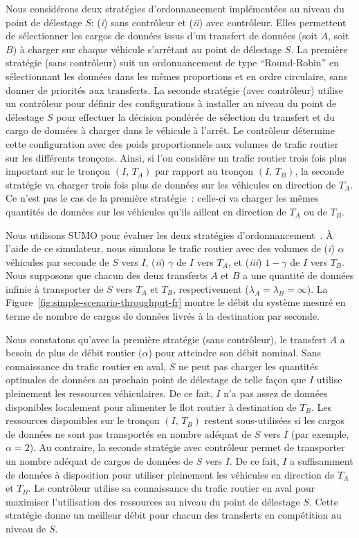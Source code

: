  
Nous considérons deux stratégies d’ordonnancement implémentées au niveau du point de délestage $S$: (\textit{i}) sans contrôleur et (\textit{ii}) avec contrôleur. Elles permettent de sélectionner les cargos de données issus d’un transfert de données (soit $A$, soit $B$) à charger sur chaque véhicule s’arrêtant au point de délestage $S$. La première stratégie (sans contrôleur) suit un ordonnancement de type ``Round-Robin'' en sélectionnant les données dans les mêmes proportions et en ordre circulaire, sans donner de priorités aux transferts. La seconde stratégie (avec contrôleur) utilise un contrôleur pour définir des configurations à installer au niveau du point de délestage $S$ pour effectuer la décision pondérée de sélection du transfert et du cargo de données à charger dans le véhicule à l’arrêt. Le contrôleur détermine cette configuration avec des poids proportionnels aux volumes de trafic routier sur les différents tronçons. Ainsi, si l’on considère un trafic routier trois fois plus important sur le tronçon $(I,\,T_A)$ par rapport au tronçon $(I,\,T_B)$, la seconde stratégie va charger trois fois plus de données sur les véhicules en direction de $T_A$. Ce n’est pas le cas de la première stratégie~: celle-ci va charger les mêmes quantités de données sur les véhicules qu’ils aillent en direction de $T_A$ ou de $T_B$. 
 
 
Nous utilisons SUMO pour évaluer les deux stratégies d’ordonnancement~\cite{behrisch2011sumo}. À l’aide de ce simulateur, nous simulons le trafic routier avec des volumes de (\textit{i}) $\alpha$ véhicules par seconde de $S$ vers $I$, (\textit{ii}) $\gamma$ de $I$ vers $T_A$, et (\textit{iii}) $1 - \gamma$ de $I$ vers $T_B$. Nous supposons que chacun des deux transferts $A$ et $B$ a une quantité de données infinie à transporter de $S$ vers $T_A$ et $T_B$, respectivement (\ie $\lambda_A = \lambda_B = \infty$). La Figure~\ref{fig:simple-scenario-throughput-fr} montre le débit du système mesuré en terme de nombre de cargos de données livrés à la destination par seconde.  
 
 
Nous constatons qu’avec la première stratégie (sans contrôleur), le transfert $A$ a besoin de plus de débit routier ($\alpha$) pour atteindre son débit nominal. Sans connaissance du trafic routier en aval, $S$ ne peut pas charger les quantités optimales de données au prochain point de délestage de telle façon que $I$ utilise pleinement les ressources véhiculaires. De ce fait, $I$ n’a pas assez de données disponibles localement pour alimenter le flot routier à destination de $T_B$. Les ressources disponibles sur le tronçon $(I,\,T_B)$ restent sous-utilisées si les cargos de données ne sont pas transportés en nombre adéquat de $S$ vers $I$ (par exemple, $\alpha = 2$). Au contraire, la seconde stratégie avec contrôleur permet de transporter un nombre adéquat de cargos de données de $S$ vers $I$. De ce fait, $I$ a suffisamment de données à disposition pour utiliser pleinement les véhicules en direction de $T_A$ et $T_B$. Le contrôleur utilise sa connaissance du trafic routier en aval pour maximiser l’utilisation des ressources au niveau du point de délestage $S$. Cette stratégie donne un meilleur débit pour chacun des transferts en compétition au niveau de $S$. 
 
